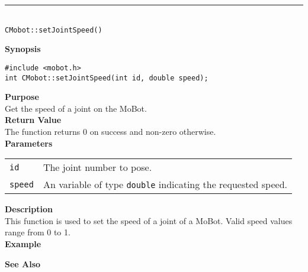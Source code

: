 \noindent
\vspace{5pt}
\rule{4.5in}{0.015in}\\
\noindent
{\LARGE \texttt{CMobot::setJointSpeed()}}\\
{}

\noindent
{\bf Synopsis}\\
\begin{verbatim}
#include <mobot.h>
int CMobot::setJointSpeed(int id, double speed);
\end{verbatim}

\noindent
{\bf Purpose}\\
Get the speed of a joint on the MoBot.\\

\noindent
{\bf Return Value}\\
The function returns 0 on success and non-zero otherwise.\\

\noindent
{\bf Parameters}
\vspace{-0.1in}
\begin{description}
\item               
\begin{tabular}{p{10 mm}p{145 mm}}
\texttt{id} & The joint number to pose. \\
\texttt{speed} & An variable of type \texttt{double} indicating the requested speed.
\end{tabular}
\end{description}

\noindent
{\bf Description}\\
This function is used to set the speed of a joint of a MoBot. Valid speed
values range from 0 to 1.
\noindent\\
{\bf Example}\\
\noindent

\noindent
{\bf See Also}\\


